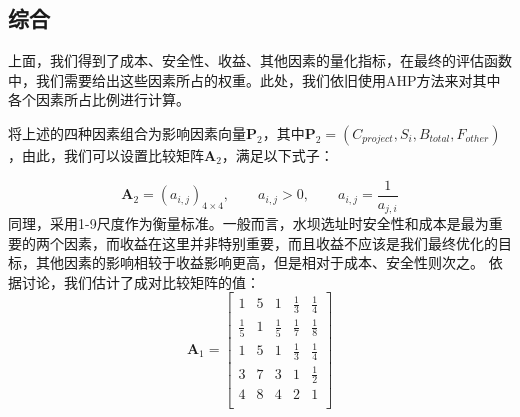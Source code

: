 \documentclass[nocover]{cumcmart}
\begin{document}
\subsection{综合}
上面，我们得到了成本、安全性、收益、其他因素的量化指标，在最终的评估函数中，我们需要给出这些因素所占的权重。此处，我们依旧使用AHP方法来对其中各个因素所占比例进行计算。

将上述的四种因素组合为影响因素向量$\textbf{P}_2$，其中$\textbf{P}_2 = (C_{project}, S_{i}, B_{total}, F_{other})$，由此，我们可以设置比较矩阵$\textbf{A}_2$，满足以下式子：

\[\textbf{A}_2 = (a_{i,j})_{4\times4}, \qquad a_{i,j}>0, \qquad a_{i,j} = \frac{1}{a_{j,i}}\]
同理，采用1-9尺度作为衡量标准。一般而言，水坝选址时安全性和成本是最为重要的两个因素，而收益在这里并非特别重要，而且收益不应该是我们最终优化的目标，其他因素的影响相较于收益影响更高，但是相对于成本、安全性则次之。
依据讨论，我们估计了成对比较矩阵的值：
\[\textbf{A}_1 = 
\left[
\begin{matrix}
1 & 5 & 1 & \frac{1}{3} & \frac{1}{4} \\
\frac{1}{5}  & 1 & \frac{1}{5} & \frac{1}{7} & \frac{1}{8} \\ 
1 & 5 & 1 & \frac{1}{3} & \frac{1}{4} \\
3 & 7 & 3 & 1 & \frac{1}{2} \\
4 & 8 & 4 & 2 & 1 \\
\end{matrix}
\right]
\]
\end{document}

